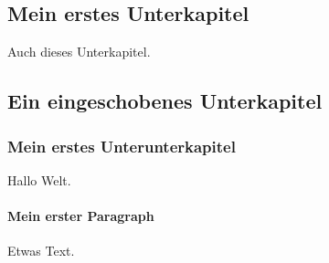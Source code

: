 \documentclass[]{article}
\begin{document}
\subsection{Mein erstes Unterkapitel}
Auch dieses Unterkapitel.
\subsection{Ein eingeschobenes Unterkapitel}
\subsubsection{Mein erstes Unterunterkapitel}	
Hallo Welt.
\paragraph{Mein erster Paragraph} Etwas Text.
\end{document}
